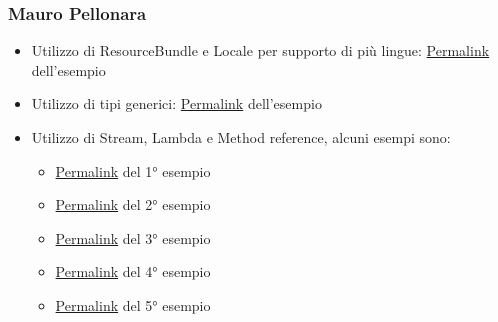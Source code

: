 \subsubsection*{Mauro Pellonara}
\begin{itemize}
    \item Utilizzo di ResourceBundle e Locale per supporto di più lingue: \href{https://github.com/MauroPello/OOP22-caesena/blob/5fae6d5fd9f79fe417edee91115e3c74f08d6e0d/src/main/java/it/unibo/caesena/view/LocaleHelper.java}{Permalink} dell'esempio
    \item Utilizzo di tipi generici: \href{https://github.com/MauroPello/OOP22-caesena/blob/5fae6d5fd9f79fe417edee91115e3c74f08d6e0d/src/main/java/it/unibo/caesena/view/scene/Scene.java}{Permalink} dell'esempio
    \item Utilizzo di Stream, Lambda e Method reference, alcuni esempi sono:
    \begin{itemize}
        \item \href{https://github.com/MauroPello/OOP22-caesena/blob/b817cad200379d563deda711ebf7773b572fb061/src/main/java/it/unibo/caesena/model/GameSetTileMediatorImpl.java#L107}{Permalink} del 1° esempio
        \item \href{https://github.com/MauroPello/OOP22-caesena/blob/dff66c49fc9fb8e6bdd8d328986f4b9ee3a4b2dc/src/main/java/it/unibo/caesena/controller/ControllerImpl.java#L134}{Permalink} del 2° esempio
        \item \href{https://github.com/MauroPello/OOP22-caesena/blob/dff66c49fc9fb8e6bdd8d328986f4b9ee3a4b2dc/src/main/java/it/unibo/caesena/controller/ControllerImpl.java#L390}{Permalink} del 3° esempio
        \item \href{https://github.com/MauroPello/OOP22-caesena/blob/b817cad200379d563deda711ebf7773b572fb061/src/main/java/it/unibo/caesena/model/GameSetTileMediatorImpl.java#L203}{Permalink} del 4° esempio
        \item \href{https://github.com/MauroPello/OOP22-caesena/blob/b817cad200379d563deda711ebf7773b572fb061/src/main/java/it/unibo/caesena/model/GameSetTileMediatorImpl.java#L213}{Permalink} del 5° esempio
    \end{itemize}
\end{itemize}

